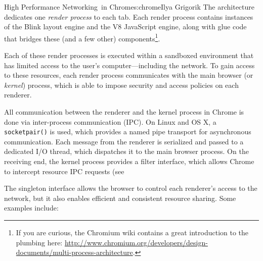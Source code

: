 \begin{aosachapter}{High Performance Networking~in Chrome}{s:chrome}{Ilya Grigorik}
The architecture dedicates one \emph{render process} to each tab. Each
render process contains instances of the Blink layout engine and the V8
JavaScript engine, along with glue code that bridges these (and a few
other) components\footnote{If you are curious, the Chromium wiki
  contains a great introduction to the plumbing here:
  \url{http://www.chromium.org/developers/design-documents/multi-process-architecture}.}.

Each of these render processes is executed within a sandboxed
environment that has limited access to the user's computer---including
the network. To gain access to these resources, each render process
communicates with the main browser (or \emph{kernel}) process, which is
able to impose security and access policies on each renderer.


All communication between the renderer and the kernel process in Chrome
is done via inter-process communication (IPC). On Linux and OS X, a
\texttt{socketpair()} is used, which provides a named pipe transport for
asynchronous communication. Each message from the renderer is serialized
and passed to a dedicated I/O thread, which dispatches it to the main
browser process. On the receiving end, the kernel process provides a
filter interface, which allows Chrome to intercept resource IPC requests
(see

The singleton interface allows the browser to control each renderer's
access to the network, but it also enables efficient and consistent
resource sharing. Some examples include:

\begin{aosaitemize}


\end{aosaitemize}
\end{aosachapter}
